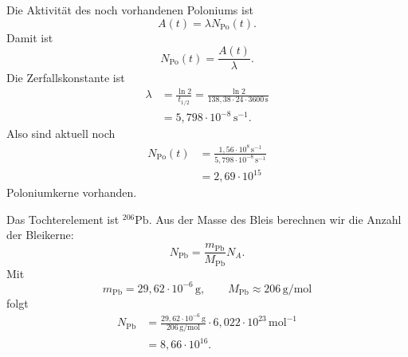 \documentclass[11pt,a4paper]{scrartcl}
\begin{document}
\begin{enumerate}[label=(\alph*)]
            \begin{calculationbox}
                Die Aktivität des noch vorhandenen Poloniums ist
                \[
                    A(t)=\lambda N_{\mathrm{Po}}(t).
                \]
                Damit ist
                \[
                    N_{\mathrm{Po}}(t)=\frac{A(t)}{\lambda}.
                \]
                Die Zerfallskonstante ist
                \begin{align*}
                    \lambda
                    &=\frac{\ln 2}{t_{1/2}}
                    =\frac{\ln 2}{138{,}38\cdot 24\cdot 3600\,\mathrm{s}}\\
                    &=5{,}798\cdot10^{-8}\,\mathrm{s}^{-1}.
                \end{align*}
                Also sind aktuell noch
                \begin{align*}
                    N_{\mathrm{Po}}(t)
                    &=\frac{1{,}56\cdot10^8\,\mathrm{s}^{-1}}{5{,}798\cdot10^{-8}\,\mathrm{s}^{-1}}\\
                    &=2{,}69\cdot10^{15}
                \end{align*}
                Poloniumkerne vorhanden.
            \end{calculationbox}

            \begin{calculationbox}
                Das Tochterelement ist ${}^{206}\mathrm{Pb}$. Aus der Masse des Bleis berechnen wir die Anzahl der Bleikerne:
                \[
                    N_{\mathrm{Pb}}=\frac{m_{\mathrm{Pb}}}{M_{\mathrm{Pb}}}N_A.
                \]
                Mit
                \[
                    m_{\mathrm{Pb}}=29{,}62\cdot10^{-6}\,\mathrm{g},
                    \qquad
                    M_{\mathrm{Pb}}\approx 206\,\mathrm{g/mol}
                \]
                folgt
                \begin{align*}
                    N_{\mathrm{Pb}}
                    &=\frac{29{,}62\cdot10^{-6}\,\mathrm{g}}{206\,\mathrm{g/mol}}
                    \cdot 6{,}022\cdot10^{23}\,\mathrm{mol}^{-1}\\
                    &=8{,}66\cdot10^{16}.
                \end{align*}
            \end{calculationbox}


\end{enumerate}
\end{document}
